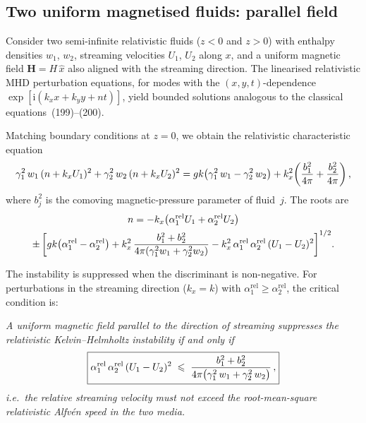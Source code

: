\subsection{Two uniform magnetised fluids: parallel field}
\label{sec:rel-11-106b}

Consider two semi-infinite relativistic fluids ($z<0$ and $z>0$) with
enthalpy densities $w_{1}$, $w_{2}$, streaming velocities $U_{1}$,
$U_{2}$ along $x$, and a uniform magnetic field $\mathbf{H}=H\,\hat{x}$
also aligned with the streaming direction.  The linearised relativistic
MHD perturbation equations, for modes with the $(x,y,t)$-dependence
$\exp[\mathrm{i}(k_{x}x+k_{y}y+nt)]$, yield bounded solutions
analogous to the classical equations~(199)--(200).

Matching boundary conditions at $z=0$, we obtain the relativistic
characteristic equation
\begin{equation}
\label{eq:rel-11-R16}
\gamma_{1}^{2}\,w_{1}\,(n+k_{x}U_{1})^{2}
+\gamma_{2}^{2}\,w_{2}\,(n+k_{x}U_{2})^{2}
= gk\bigl(\gamma_{1}^{2}\,w_{1}-\gamma_{2}^{2}\,w_{2}\bigr)
+ k_{x}^{2}\!\left(\frac{b_{1}^{2}}{4\pi}+\frac{b_{2}^{2}}{4\pi}\right),
\end{equation}
where $b_{j}^{2}$ is the comoving magnetic-pressure parameter of
fluid~$j$.  The roots are
\begin{multline}
\label{eq:rel-11-R17}
n = -k_{x}\bigl(\alpha_{1}^{\mathrm{rel}}U_{1}
+\alpha_{2}^{\mathrm{rel}}U_{2}\bigr) \\
\pm\left[gk\bigl(\alpha_{1}^{\mathrm{rel}}-\alpha_{2}^{\mathrm{rel}}\bigr)
+ k_{x}^{2}\,\frac{b_{1}^{2}+b_{2}^{2}}
{4\pi(\gamma_{1}^{2}w_{1}+\gamma_{2}^{2}w_{2})}
- k_{x}^{2}\,\alpha_{1}^{\mathrm{rel}}\,\alpha_{2}^{\mathrm{rel}}\,
(U_{1}-U_{2})^{2}\right]^{1/2}\!.
\end{multline}

The instability is suppressed when the discriminant is non-negative.
For perturbations in the streaming direction ($k_{x}=k$) with
$\alpha_{1}^{\mathrm{rel}}\geqslant\alpha_{2}^{\mathrm{rel}}$, the
critical condition is:

\smallskip
\noindent\textit{A uniform magnetic field parallel to the direction of
streaming suppresses the relativistic Kelvin--Helmholtz instability if
and only if}
\begin{equation}
\label{eq:rel-11-R18}
\boxed{
\alpha_{1}^{\mathrm{rel}}\,\alpha_{2}^{\mathrm{rel}}\,(U_{1}-U_{2})^{2}
\;\leqslant\;
\frac{b_{1}^{2}+b_{2}^{2}}
{4\pi\bigl(\gamma_{1}^{2}\,w_{1}+\gamma_{2}^{2}\,w_{2}\bigr)}\,,}
\end{equation}
\textit{i.e.\ the relative streaming velocity must not exceed the
root-mean-square relativistic Alfv\'en speed in the two media.}

